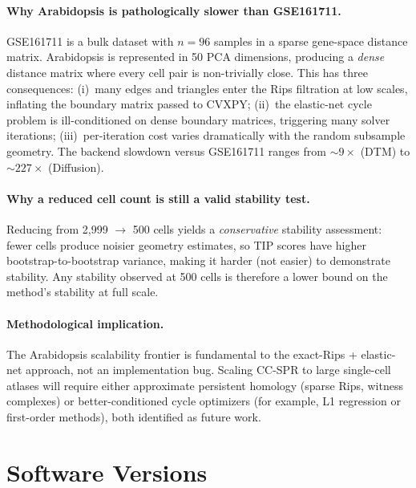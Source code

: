 \documentclass[11pt]{article}
\begin{document}
\paragraph{Why Arabidopsis is pathologically slower than GSE161711.}
GSE161711 is a bulk dataset with $n = 96$ samples in a sparse gene-space distance matrix.
Arabidopsis is represented in 50 PCA dimensions, producing a \emph{dense} distance matrix where every cell pair is non-trivially close.
This has three consequences:
(i)~many edges and triangles enter the Rips filtration at low scales, inflating the boundary matrix passed to CVXPY;
(ii)~the elastic-net cycle problem is ill-conditioned on dense boundary matrices, triggering many solver iterations;
(iii)~per-iteration cost varies dramatically with the random subsample geometry.
The backend slowdown versus GSE161711 ranges from $\sim 9\times$ (DTM) to $\sim 227\times$ (Diffusion).

\paragraph{Why a reduced cell count is still a valid stability test.}
Reducing from 2{,}999 $\to$ 500 cells yields a \emph{conservative} stability assessment: fewer cells produce noisier geometry estimates, so TIP scores have higher bootstrap-to-bootstrap variance, making it harder (not easier) to demonstrate stability.
Any stability observed at 500 cells is therefore a lower bound on the method's stability at full scale.

\paragraph{Methodological implication.}
The Arabidopsis scalability frontier is fundamental to the exact-Rips + elastic-net approach, not an implementation bug.
Scaling CC-SPR to large single-cell atlases will require either approximate persistent homology (sparse Rips, witness complexes) or better-conditioned cycle optimizers (for example, L1 regression or first-order methods), both identified as future work.


\section{Software Versions}
\label{sec:supp_software}
\end{document}
